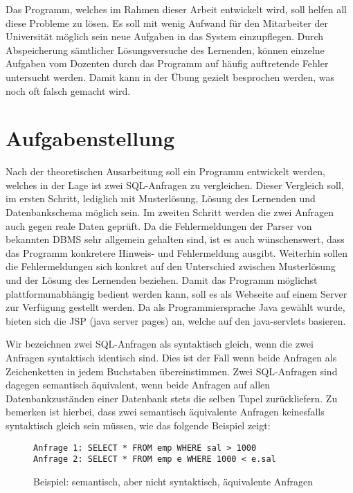 Das Programm, welches im Rahmen dieser Arbeit entwickelt wird, soll helfen all diese Probleme zu lösen. Es soll mit wenig Aufwand für den Mitarbeiter der Universität möglich sein neue Aufgaben in das System einzupflegen. Durch Abspeicherung sämtlicher Lösungsversuche des Lernenden, können einzelne Aufgaben vom Dozenten durch das Programm auf häufig auftretende Fehler untersucht werden. Damit kann in der Übung gezielt besprochen werden, was noch oft falsch gemacht wird.

\section{Aufgabenstellung}

Nach der theoretischen Ausarbeitung soll ein Programm entwickelt werden, welches in der Lage ist zwei SQL-Anfragen zu vergleichen. Dieser Vergleich soll, im ersten Schritt, lediglich mit Musterlösung, Lösung des Lernenden und Datenbankschema möglich sein. Im zweiten Schritt werden die zwei Anfragen auch gegen reale Daten geprüft. Da die Fehlermeldungen der Parser von bekannten DBMS sehr allgemein gehalten sind, ist es auch wünschenswert, dass das Programm konkretere Hinweis- und Fehlermeldung ausgibt. Weiterhin sollen die Fehlermeldungen sich konkret auf den Unterschied zwischen Musterlösung und der Lösung des Lernenden beziehen. Damit das Programm möglichst plattformunabhängig bedient werden kann, soll es als Webseite auf einem Server zur Verfügung gestellt werden. Da als Programmiersprache Java gewählt wurde, bieten sich die JSP (java server pages) an, welche auf den java-servlets basieren.

Wir bezeichnen zwei SQL-Anfragen als syntaktisch gleich, wenn die zwei Anfragen syntaktisch identisch sind. Dies ist der Fall wenn beide Anfragen als Zeichenketten in jedem Buchstaben übereinstimmen. Zwei SQL-Anfragen sind dagegen semantisch äquivalent, wenn beide Anfragen auf allen Datenbankzuständen einer Datenbank stets die selben Tupel zurückliefern. Zu bemerken ist hierbei, dass zwei semantisch äquivalente Anfragen keinesfalls syntaktisch gleich sein müssen, wie das folgende Beispiel zeigt:

\begin{figure}[h]
\begin{verbatim}
Anfrage 1: SELECT * FROM emp WHERE sal > 1000
Anfrage 2: SELECT * FROM emp e WHERE 1000 < e.sal
\end{verbatim}
\caption{Beispiel: semantisch, aber nicht syntaktisch, äquivalente Anfragen}
\end{figure}

